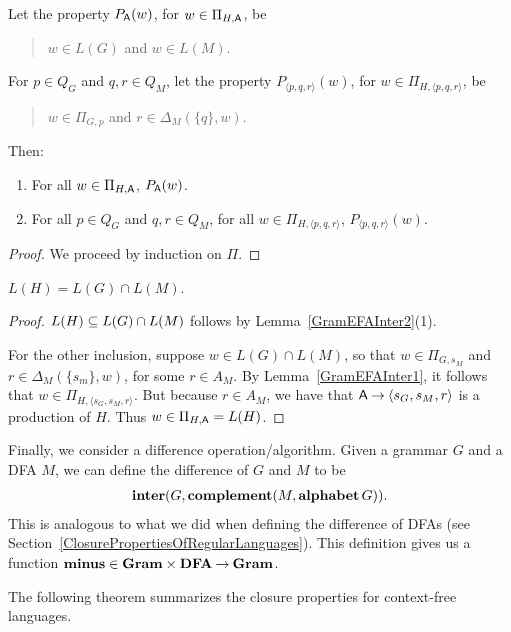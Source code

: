 \begin{lemma}
\label{GramEFAInter2}
Let the property $P_{\mathsf{A}}(w)$, for $w\in\Pi_{H,\mathsf{A}}$, be
\begin{quotation}
\noindent
$w\in L(G)$ and $w\in L(M)$.  
\end{quotation}
For $p\in Q_G$ and $q,r\in Q_M$,
let the property $P_{\langle p,q,r\rangle}(w)$, for
$w\in\Pi_{H,\langle p,q,r\rangle}$, be
\begin{quotation}
\noindent
$w\in\Pi_{G,p}$ and $r\in\Delta_M(\{q\},w)$.
\end{quotation}
Then:
\begin{enumerate}[(1)]
\item For all $w\in\Pi_{H,\mathsf{A}}$, $P_{\mathsf{A}}(w)$.

\item For all $p\in Q_G$ and $q,r\in Q_M$, for all
$w\in\Pi_{H,\langle p,q,r\rangle}$, $P_{\langle p,q,r\rangle}(w)$.
\end{enumerate}
\end{lemma}

\begin{proof}
We proceed by induction on $\Pi$.
\end{proof}

\begin{lemma}
$L(H) = L(G)\cap L(M)$.
\end{lemma}

\begin{proof}
$L(H) \subseteq L(G)\cap L(M)$ follows by Lemma~\ref{GramEFAInter2}(1).

For the other inclusion, suppose $w\in L(G)\cap L(M)$, so that
$w\in\Pi_{G,s_M}$ and $r\in\Delta_M(\{s_m\},w)$, for some $r\in A_M$. By
Lemma~\ref{GramEFAInter1}, it follows that
$w\in\Pi_{H,\langle s_G, s_M, r\rangle}$. But because $r\in A_M$, we
have that $\mathsf{A}\mathbin{\to}\langle s_G, s_M, r\rangle$ is a production of $H$.
Thus $w\in\Pi_{H,\mathsf{A}}=L(H)$.
\end{proof}

Finally, we consider a difference operation/algorithm.
Given a grammar $G$ and a DFA $M$, we can define the difference of
$G$ and $M$ to be
\begin{gather*}
\mathbf{inter}(G, \mathbf{complement}(M, \mathbf{alphabet}\,G)) .
\end{gather*}
This is analogous to what we did when defining the difference of
DFAs (see Section~\ref{ClosurePropertiesOfRegularLanguages}).
This definition gives us a function
$\mathbf{minus}\in\mathbf{Gram}\times\mathbf{DFA}\mathbin{\to}\mathbf{Gram}$.

The following theorem summarizes the closure properties for context-free
languages.


